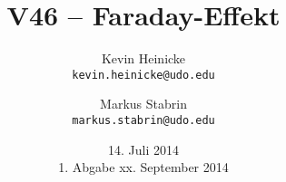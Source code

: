 



\title{%
    V46 -- Faraday-Effekt
}
\author{%
    Kevin Heinicke\\
    \texttt{kevin.heinicke@udo.edu}
    \and
    Markus Stabrin\\
    \texttt{markus.stabrin@udo.edu}
}
\date{%
    14. Juli 2014\\
    {\small 1. Abgabe} xx. September 2014
}

    \maketitle%
    \tableofcontents
    \newpage

    

    \printbibliography

